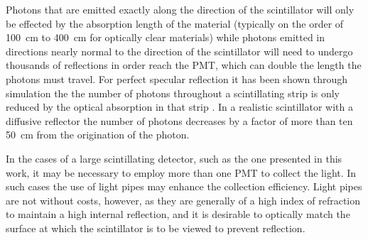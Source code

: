 Photons that are emitted exactly along the direction of the scintillator will only be effected by the  absorption length of the material (typically on the order of \SI{100}{\cm} to \SI{400}{\cm} for optically clear materials\cite{SG_PlasticScint_2008}) while photons emitted in directions nearly normal to the direction of the scintillator will need to undergo thousands of reflections in order reach the PMT, which can double the length the photons must travel.
For perfect specular reflection it has been shown through simulation the the number of photons throughout a scintillating strip is only reduced by the optical absorption in that strip \cite{riggi_introducing_2011}.
In a realistic scintillator with a diffusive reflector the number of photons decreases by a factor of more than ten \SI{50}{\cm} from the origination of the photon\cite{riggi_introducing_2011}.

In the cases of a large scintillating detector, such as the one presented in this work, it  may be necessary to employ more than one PMT to collect the light.
In such cases the use of light pipes may enhance the collection efficiency. 
Light pipes are not without costs, however, as they are generally of a high index of refraction to maintain a high internal reflection, and it is desirable to optically match the surface at which the scintillator is to be viewed to prevent reflection.

